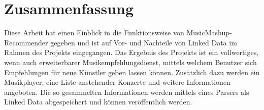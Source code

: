 \section{Zusammenfassung}

Diese Arbeit hat einen Einblick in die Funktionsweise von MusicMashup-Recommender gegeben und ist auf Vor- und Nachteile von Linked Data im Rahmen des Projekts eingegangen. Das Ergebnis des Projekts ist ein vollwertiges, wenn auch erweiterbarer Musikempfehlungsdienst, mittels welchem Benutzer sich Empfehlungen für neue Künstler geben lassen können. Zusätzlich dazu werden ein Musikplayer, eine Liste anstehender Konzerte und weitere Informationen angeboten. Die so gesammelten Informationen werden mittels eines Parsers als Linked Data abgespeichert und können veröffentlich werden.

